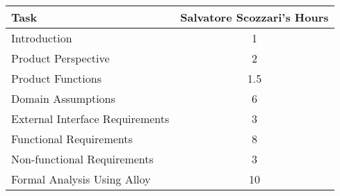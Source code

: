 \begin{center}
	\begin{tabular}{| l | c |}
		\hline
		\textbf{Task} & \textbf{Salvatore Scozzari's Hours} \\ \hline
		Introduction & 1 \\ \hline
		Product Perspective & 2 \\ \hline
		Product Functions & 1.5 \\ \hline
		Domain Assumptions & 6 \\ \hline
		External Interface Requirements & 3 \\ \hline
		Functional Requirements & 8 \\ \hline
		Non-functional Requirements & 3 \\ \hline
		Formal Analysis Using Alloy & 10 \\
		\hline	
	\end{tabular}
\end{center}